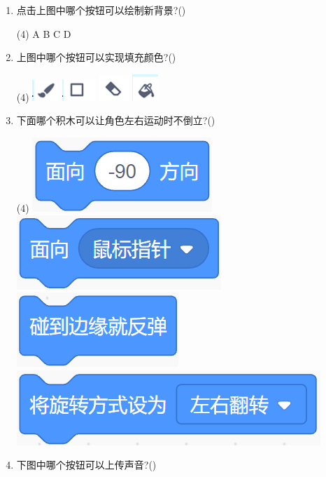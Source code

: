 \documentclass[10pt, a4paper]{article}
\begin{document}
\begin{enumerate}
        \item 点击上图中哪个按钮可以绘制新背景?(\qquad)
        \begin{tasks}(4)
            \task A
            \task B
            \task C
            \task D
        \end{tasks}

        \item 上图中哪个按钮可以实现填充颜色?(\qquad)
        \begin{tasks}(4)
            \task \includegraphics[width=.04\textwidth]{21a.png}
            \task \includegraphics[width=.04\textwidth]{21b.png}
            \task \includegraphics[width=.04\textwidth]{21c.png}
            \task \includegraphics[width=.04\textwidth]{21d.png}
        \end{tasks}

        \item 下面哪个积木可以让角色左右运动时不倒立?(\qquad)
        \begin{tasks}(4)
            \task \includegraphics[width=.12\textwidth]{22a.png}
            \task \includegraphics[width=.15\textwidth]{22b.png}
            \task \includegraphics[width=.12\textwidth]{22c.png}
            \task \includegraphics[width=.18\textwidth]{22d.png}
        \end{tasks}

        \item 下图中哪个按钮可以上传声音?(\qquad)
        

\end{enumerate}
\end{document}
